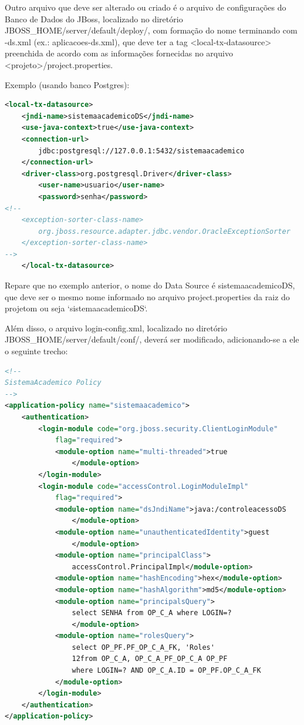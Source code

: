Outro arquivo que deve ser alterado ou criado é o arquivo de configurações do Banco de Dados do JBoss, localizado no diretório JBOSS\_HOME/server/default/deploy/, com formação do nome terminando com -ds.xml (ex.: aplicacoes-ds.xml), que deve ter a tag <local-tx-datasource> preenchida de acordo com as informações fornecidas no arquivo <projeto>/project.properties.

Exemplo (usando banco Postgres):

\begin{lstlisting}[language=xml]
<local-tx-datasource>
	<jndi-name>sistemaacademicoDS</jndi-name>
	<use-java-context>true</use-java-context>
	<connection-url>
		jdbc:postgresql://127.0.0.1:5432/sistemaacademico
	</connection-url> 
	<driver-class>org.postgresql.Driver</driver-class>
		<user-name>usuario</user-name>
		<password>senha</password>
<!--
	<exception-sorter-class-name>
		org.jboss.resource.adapter.jdbc.vendor.OracleExceptionSorter
	</exception-sorter-class-name>
-->
	</local-tx-datasource>
\end{lstlisting}

Repare que no exemplo anterior, o nome do Data Source é sistemaacademicoDS, que deve ser o mesmo nome informado no arquivo project.properties da raiz do projetom ou seja `sistemaacademicoDS`.

Além disso, o arquivo login-config.xml, localizado no diretório JBOSS\_HOME/server/default/conf/, deverá ser modificado, adicionando-se a ele o seguinte trecho:

\begin{lstlisting}[language=xml]
<!--
SistemaAcademico Policy
-->
<application-policy name="sistemaacademico">
	<authentication>
		<login-module code="org.jboss.security.ClientLoginModule"
			flag="required">
			<module-option name="multi-threaded">true
				</module-option>
		</login-module>
		<login-module code="accessControl.LoginModuleImpl" 
			flag="required">
			<module-option name="dsJndiName">java:/controleacessoDS
				</module-option>
			<module-option name="unauthenticatedIdentity">guest
				</module-option>
			<module-option name="principalClass">
				accessControl.PrincipalImpl</module-option> 
			<module-option name="hashEncoding">hex</module-option> 
			<module-option name="hashAlgorithm">md5</module-option>
			<module-option name="principalsQuery">
				select SENHA from OP_C_A where LOGIN=?
				</module-option>
			<module-option name="rolesQuery">
				select OP_PF.PF_OP_C_A_FK, 'Roles'
				12from OP_C_A, OP_C_A_PF_OP_C_A OP_PF
				where LOGIN=? AND OP_C_A.ID = OP_PF.OP_C_A_FK
			</module-option>
		</login-module>
	</authentication>
</application-policy>
\end{lstlisting}

